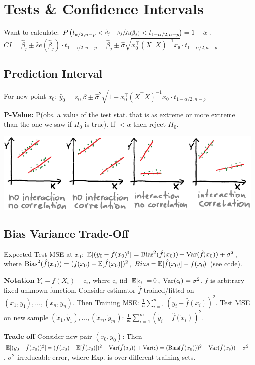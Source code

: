 \section*{Tests \& Confidence Intervals}
Want to calculate: $P\left( t_{\alpha / 2, n-p} < \sfrac{\hat \beta_j - \beta_j} {\hat {se}(\hat \beta_j)} < t_{1-\alpha / 2, n-p} \right) = 1 - \alpha$.
$CI = \hat \beta_j \pm \hat se(\hat \beta_j) \cdot t_{1- \alpha / 2, n-p} = \hat \beta_j \pm \hat \sigma \sqrt{x_0^\top (X^\top X)^{-1} x_0} \cdot t_{1- \alpha / 2, n-p}$
\subsection*{Prediction Interval}
For new point $x_0$:
$\hat y_0 = x_0^\top \beta \pm \hat \sigma^2 \sqrt{1 + x_0^\top (X^\top X)^{-1}x_0} \cdot t_{1-\alpha / 2, n-p}$

\textbf{P-Value:} P(obs. a value of the test stat. that is as extreme or more extreme than the one we saw if $H_0$ is true).
If $< \alpha$ then reject $H_0$.

\includegraphics[width=0.7\linewidth]{img/interaction.PNG}

\subsection*{Bias Variance Trade-Off}
Expected Test MSE at $x_0$: $\mathbb{E}[(y_0 - \hat f(x_0)^2] = \text{Bias}^2 (\hat f(x_0)) + \text{Var}(\hat f(x_0)) + \sigma^2$, where $\text{Bias}^2(\hat f(x_0)) = (f(x_0)-\mathbb{E}[\hat f(x_0)])^2$, $Bias = \mathbb{E}[\hat f(x_0)] - f(x_0)$ (see code).

\textbf{Notation}
$Y_i=f(X_i)+\epsilon_i$, where $\epsilon_i$ iid, $\mathbb{E}[\epsilon_i]=0$, $\textup{Var}(\epsilon_i)=\sigma^2$. $f$ is arbitrary fixed unknown function. Consider estimator $\hat f$ trained/fitted on $(x_1,y_1),...,(x_n,y_n)$. Then Training MSE: $\tfrac{1}{n} \sum_{i=1}^n (y_i-\hat f(x_i))^2$. Test MSE on new sample $(\tilde x_1, \tilde y_1),...,(\tilde x_m, \tilde y_m)$: $\tfrac{1}{m}\sum_{i=1}^m (\tilde y_i-\hat f(\tilde x_i))^2$.

\textbf{Trade off}
Consider new pair $(x_0,y_0)$: Then $\mathbb{E}[(y_0-\hat f(x_0))^2]=(f(x_0)-\mathbb{E}[\hat f(x_0)])^2+\textup{Var}(\hat f(x_0))+\textup{Var}(\epsilon)=(\textup{Bias}(\hat f(x_0)))^2+\textup{Var}(\hat f(x_0))+{\sigma^2}$, $\sigma^2$ irreducable error, where Exp. is over different training sets.

